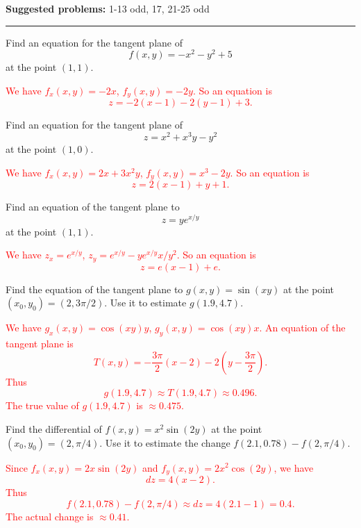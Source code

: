\documentclass[12pt,reqno]{amsart}
\begin{document}
\textbf{Suggested problems:} 1-13 odd, 17, 21-25 odd

\medskip
\hrule

\medskip

\prob Find an equation for the tangent plane of
	\[f(x,y) = -x^2-y^2+5
	\]
at the point $(1,1)$.

\medskip
\textcolor{red}{We have $f_x(x,y) = -2x$, $f_y(x,y) = -2y$. So an equation is
	\[z = -2(x-1)-2(y-1) + 3.
	\]}
\medskip

\prob Find an equation for the tangent plane of
	\[z = x^2+x^3y-y^2
	\]	
at the point $(1,0)$.

\medskip
\textcolor{red}{We have $f_x(x,y) = 2x+3x^2y$, $f_y(x,y) = x^3-2y$. So an equation is
	\[z = 2(x-1) + y + 1.
	\]}
\medskip

\prob Find an equation of the tangent plane to
	\[z = y e^{x/y}
	\]
at the point $(1,1)$.

\medskip
\textcolor{red}{We have $z_x = e^{x/y}$, $z_y = e^{x/y} - ye^{x/y}x/y^2$. So an equation is
	\[z = e(x-1) + e.
	\]}
\medskip


\prob Find the equation of the tangent plane to $g(x,y)=\sin{(xy)}$ at the point $(x_0,y_0) = (2,3\pi/2)$. Use it to estimate $g(1.9,4.7)$.

\medskip
\textcolor{red}{We have $g_x(x,y) = \cos{(xy)}y$, $g_y(x,y) = \cos{(xy)}x$. An equation of the tangent plane is
	\[T(x,y) = -\frac{3\pi}{2}(x-2) -2\left(y-\frac{3\pi}{2} \right).
	\]
Thus
	\[g(1.9,4.7) \approx T(1.9,4.7) \approx 0.496.
	\]
The true value of $g(1.9,4.7)$ is $\approx 0.475$.}

\medskip
\prob Find the differential of $f(x,y) = x^2 \sin{(2y)}$ at the point $(x_0,y_0) = (2,\pi/4)$. Use it to estimate the change $f(2.1,0.78)-f(2,\pi/4)$.

\medskip
\textcolor{red}{Since $f_x(x,y) = 2x\sin{(2y)}$ and $f_y(x,y) = 2x^2\cos{(2y)}$, we have
	\[dz = 4(x-2).
	\]
Thus
	\[f(2.1,0.78) - f(2,\pi/4) \approx dz = 4(2.1-1) = 0.4.
	\]
The actual change is $\approx 0.41$.}
\end{document}

